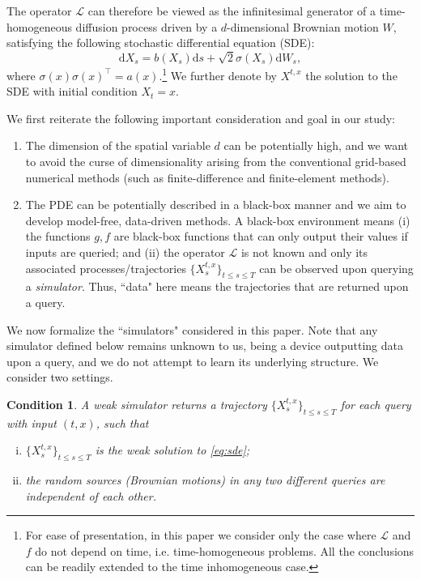 \documentclass[twoside,11pt]{article}
\newcommand{\dd}{\mathrm{d}}
\newtheorem{cond}{Condition}
\newcommand{\1}{\mathbf{1}}
\numberwithin{equation}{section}
\begin{document}
The operator $\mathcal L$ can therefore be viewed as the infinitesimal generator of a time-homogeneous diffusion process driven by a $d$-dimensional Brownian motion $W$, satisfying the following stochastic differential equation (SDE):
\begin{equation}\label{eq:sde}
     \dd X_s = b(X_s) \dd s + \sqrt{2} \sigma(X_s) \dd W_s,
\end{equation}
where $\sigma(x)\sigma(x)^\top = a(x)$.\footnote{For ease of presentation, in this paper we consider only the case where $\mathcal L$ and $f$ do not depend on time, i.e. time-homogeneous problems. All the conclusions can be readily extended to the time inhomogeneous case.} We further denote by $X^{t,x}$  the solution to the SDE with initial condition $X_t = x$.

We first reiterate  the following important consideration and goal in our study: %
\begin{enumerate}[(1)]
\item The dimension of the spatial variable $d$ can be potentially high, and we want to avoid the curse of dimensionality arising from the conventional grid-based numerical methods (such as finite-difference and finite-element methods).
\item The PDE can be potentially described in a black-box manner and we aim to develop model-free, data-driven methods. A black-box environment means (i) the functions $g,f$ are black-box functions that can only output their values if inputs are queried; and (ii) the operator $\mathcal L$ is not known and only its associated processes/trajectories $\{X_s^{t,x}\}_{t\leq s\leq T}$ can be observed upon querying a \textit{simulator}. Thus, ``data" here means the trajectories that are returned upon a query.
\end{enumerate}


We now formalize the ``simulators" considered in this paper. Note that any simulator defined below remains unknown to us, being a device outputting data upon a query, and we do not attempt to learn its underlying structure. We consider two settings.
\begin{cond}
\label{cond:weak simulator}
A weak simulator returns a trajectory $\{X_s^{t,x}\}_{t\leq s\leq T}$ for each query with input $(t,x)$, such that
\begin{enumerate}[(i)]
    \item $\{X_s^{t,x}\}_{t\leq s\leq T}$ is the weak solution to \eqref{eq:sde};
    \item the random sources (Brownian motions) in any two different queries are independent of each other.
\end{enumerate}
\end{cond}
\end{document}
